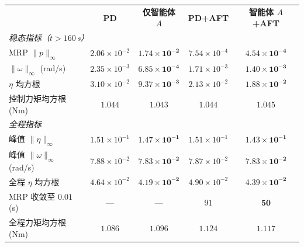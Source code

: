 \begin{table}[htbp]
\centering
{}
\label{tab:scenario4}
\begin{tabular}{lcccc}
\toprule
& \textbf{PD} & \textbf{仅智能体 $A$} & \textbf{PD+AFT} & \textbf{智能体 $A$+AFT} \\
\cmidrule(lr){2-3} \cmidrule(lr){4-5}
\multicolumn{5}{l}{\textit{稳态指标（$t > 160$\,s）}} \\
\cmidrule(lr){2-3} \cmidrule(lr){4-5}
MRP $\|p\|_\infty$           & $2.06\times10^{-2}$ & $\mathbf{1.74\times10^{-2}}$ & $7.54\times10^{-4}$ & $\mathbf{4.54\times10^{-4}}$ \\
$\|\omega\|_\infty$ (rad/s)  & $2.35\times10^{-3}$ & $\mathbf{6.85\times10^{-4}}$ & $1.71\times10^{-3}$ & $\mathbf{1.40\times10^{-3}}$ \\
$\eta$ 均方根                & $3.10\times10^{-2}$ & $\mathbf{9.37\times10^{-3}}$ & $2.13\times10^{-2}$ & $\mathbf{1.88\times10^{-2}}$ \\
控制力矩均方根 (Nm)          & $1.044$ & $\mathbf{1.043}$ & $\mathbf{1.044}$ & $1.045$ \\
\cmidrule(lr){2-3} \cmidrule(lr){4-5}
\multicolumn{5}{l}{\textit{全程指标}} \\
\cmidrule(lr){2-3} \cmidrule(lr){4-5}
峰值 $\|\eta\|_\infty$       & $1.51\times10^{-1}$ & $\mathbf{1.47\times10^{-1}}$ & $1.51\times10^{-1}$ & $\mathbf{1.43\times10^{-1}}$ \\
峰值 $\|\omega\|_\infty$ (rad/s) & $7.88\times10^{-2}$ & $\mathbf{7.83\times10^{-2}}$ & $7.87\times10^{-2}$ & $\mathbf{7.83\times10^{-2}}$ \\
全程 $\eta$ 均方根           & $4.64\times10^{-2}$ & $\mathbf{4.19\times10^{-2}}$ & $4.90\times10^{-2}$ & $\mathbf{4.39\times10^{-2}}$ \\
MRP 收敛至 $0.01$ (s)        & --- & --- & $91$ & $\mathbf{50}$ \\
全程力矩均方根 (Nm)          & $\mathbf{1.086}$ & $1.096$ & $1.124$ & $\mathbf{1.117}$ \\
\bottomrule
\end{tabular}
\end{table}

